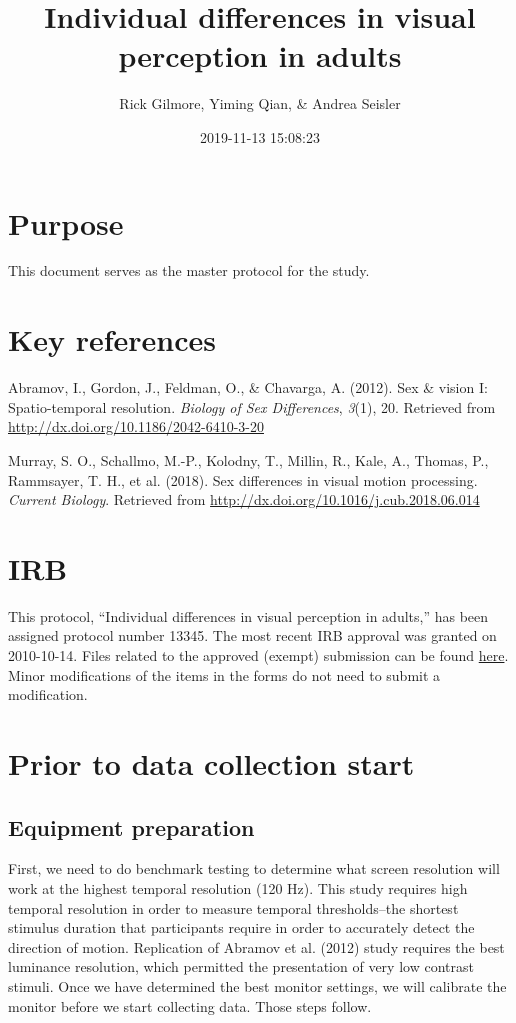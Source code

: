\documentclass[]{article}
\title{Individual differences in visual perception in adults}
\author{Rick Gilmore, Yiming Qian, \& Andrea Seisler}
\date{2019-11-13 15:08:23}
\begin{document}
\maketitle

{
\setcounter{tocdepth}{3}
\tableofcontents
}
\section{Purpose}\label{purpose}

This document serves as the master protocol for the study.

\section{Key references}\label{key-references}

Abramov, I., Gordon, J., Feldman, O., \& Chavarga, A. (2012). Sex \&
vision I: Spatio-temporal resolution. \emph{Biology of Sex Differences},
\emph{3}(1), 20. Retrieved from
\url{http://dx.doi.org/10.1186/2042-6410-3-20}

Murray, S. O., Schallmo, M.-P., Kolodny, T., Millin, R., Kale, A.,
Thomas, P., Rammsayer, T. H., et al. (2018). Sex differences in visual
motion processing. \emph{Current Biology}. Retrieved from
\url{http://dx.doi.org/10.1016/j.cub.2018.06.014}

\section{IRB}\label{irb}

This protocol, ``Individual differences in visual perception in
adults,'' has been assigned protocol number 13345. The most recent IRB
approval was granted on 2010-10-14. Files related to the approved
(exempt) submission can be found \href{../irb/2019-10-24}{here}. Minor
modifications of the items in the forms do not need to submit a
modification.

\section{Prior to data collection
start}\label{prior-to-data-collection-start}

\subsection{Equipment preparation}\label{equipment-preparation}

First, we need to do benchmark testing to determine what screen
resolution will work at the highest temporal resolution (120 Hz). This
study requires high temporal resolution in order to measure temporal
thresholds--the shortest stimulus duration that participants require in
order to accurately detect the direction of motion. Replication of
Abramov et al. (2012) study requires the best luminance resolution,
which permitted the presentation of very low contrast stimuli. Once we
have determined the best monitor settings, we will calibrate the monitor
before we start collecting data. Those steps follow.
\end{document}

